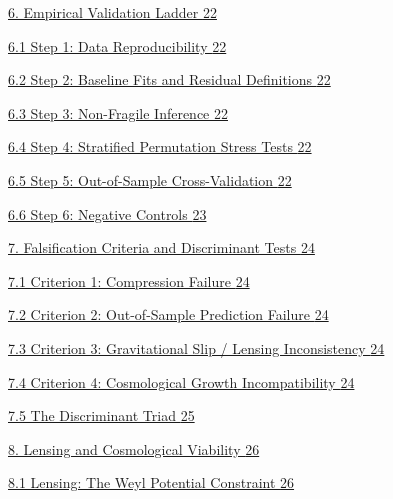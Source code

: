 \hyperref[empirical-validation-ladder]{6. Empirical Validation Ladder \hyperref[empirical-validation-ladder]{22}}

\hyperref[step-1-data-reproducibility]{6.1 Step 1: Data Reproducibility \hyperref[step-1-data-reproducibility]{22}}

\hyperref[step-2-baseline-fits-and-residual-definitions]{6.2 Step 2: Baseline Fits and Residual Definitions \hyperref[step-2-baseline-fits-and-residual-definitions]{22}}

\hyperref[step-3-non-fragile-inference]{6.3 Step 3: Non-Fragile Inference \hyperref[step-3-non-fragile-inference]{22}}

\hyperref[step-4-stratified-permutation-stress-tests]{6.4 Step 4: Stratified Permutation Stress Tests \hyperref[step-4-stratified-permutation-stress-tests]{22}}

\hyperref[step-5-out-of-sample-cross-validation]{6.5 Step 5: Out-of-Sample Cross-Validation \hyperref[step-5-out-of-sample-cross-validation]{22}}

\hyperref[step-6-negative-controls]{6.6 Step 6: Negative Controls \hyperref[step-6-negative-controls]{23}}

\hyperref[falsification-criteria-and-discriminant-tests]{7. Falsification Criteria and Discriminant Tests \hyperref[falsification-criteria-and-discriminant-tests]{24}}

\hyperref[criterion-1-compression-failure]{7.1 Criterion 1: Compression Failure \hyperref[criterion-1-compression-failure]{24}}

\hyperref[criterion-2-out-of-sample-prediction-failure]{7.2 Criterion 2: Out-of-Sample Prediction Failure \hyperref[criterion-2-out-of-sample-prediction-failure]{24}}

\hyperref[criterion-3-gravitational-slip-lensing-inconsistency]{7.3 Criterion 3: Gravitational Slip / Lensing Inconsistency \hyperref[criterion-3-gravitational-slip-lensing-inconsistency]{24}}

\hyperref[criterion-4-cosmological-growth-incompatibility]{7.4 Criterion 4: Cosmological Growth Incompatibility \hyperref[criterion-4-cosmological-growth-incompatibility]{24}}

\hyperref[the-discriminant-triad]{7.5 The Discriminant Triad \hyperref[the-discriminant-triad]{25}}

\hyperref[lensing-and-cosmological-viability]{8. Lensing and Cosmological Viability \hyperref[lensing-and-cosmological-viability]{26}}

\hyperref[lensing-the-weyl-potential-constraint]{8.1 Lensing: The Weyl Potential Constraint \hyperref[lensing-the-weyl-potential-constraint]{26}}

